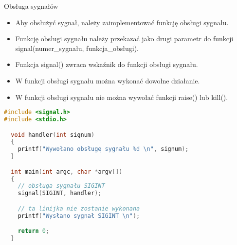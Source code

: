 \documentclass[notheorems, aspectratio=54]{beamer}
\begin{document}
\begin{frame}
Obsługa sygnałów

\begin{itemize}
  \item Aby obsłużyć sygnał, należy zaimplementować funkcję obsługi sygnału.
  \item Funkcję obsługi sygnału należy przekazać jako drugi parametr do funkcji signal(numer_sygnału, funkcja_obsługi).
  \item Funkcja signal() zwraca wskaźnik do funkcji obsługi sygnału.
  \item W funkcji obsługi sygnału można wykonać dowolne działanie.
  \item W funkcji obsługi sygnału nie można wywołać funkcji raise() lub kill().
\end{itemize}

\begin{lstlisting}[language=C++]
#include <signal.h>
#include <stdio.h>

  void handler(int signum)
  {
    printf("Wywołano obsługę sygnału %d \n", signum);
  }

  int main(int argc, char *argv[])
  {
    // obsługa sygnału SIGINT
    signal(SIGINT, handler);

    // ta linijka nie zostanie wykonana
    printf("Wysłano sygnał SIGINT \n");

    return 0;
  }
\end{lstlisting}
\end{frame}  
\end{document}
